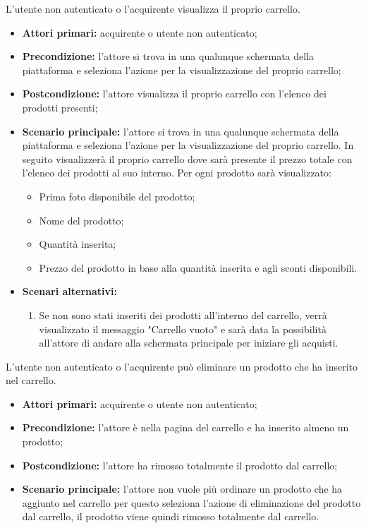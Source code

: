 L'utente non autenticato o l'acquirente visualizza il proprio carrello.
\begin{itemize}
    \item \textbf{Attori primari:} acquirente o utente non autenticato;
    \item \textbf{Precondizione:} l'attore si trova in una qualunque schermata della piattaforma e seleziona l'azione per la visualizzazione del proprio carrello;
    \item \textbf{Postcondizione:} l'attore visualizza il proprio carrello con l'elenco dei prodotti presenti;
    \item \textbf{Scenario principale:} l'attore si trova in una qualunque schermata della piattaforma e seleziona l'azione per la visualizzazione del proprio carrello. In seguito visualizzerà il proprio carrello dove sarà presente il prezzo totale con l'elenco dei prodotti al suo interno. Per ogni prodotto sarà visualizzato:
    \begin{itemize}
        \item Prima foto disponibile del prodotto;
        \item Nome del prodotto;
        \item Quantità inserita;
        \item Prezzo del prodotto in base alla quantità inserita e agli sconti disponibili.
    \end{itemize}
    \item \textbf{Scenari alternativi:} 
    \begin{enumerate}[label=\lett]
        \item Se non sono stati inseriti dei prodotti all'interno del carrello, verrà visualizzato il messaggio "Carrello vuoto" e sarà data la possibilità all'attore di andare alla schermata principale per iniziare gli acquisti.
    \end{enumerate}
\end{itemize}


L'utente non autenticato o l'acquirente può eliminare un prodotto che ha inserito nel carrello.
\begin{itemize}
    \item \textbf{Attori primari:} acquirente o utente non autenticato;
    \item \textbf{Precondizione:} l'attore è nella pagina del carrello e ha inserito almeno un prodotto;
    \item \textbf{Postcondizione:} l'attore ha rimosso totalmente il prodotto dal carrello;
    \item \textbf{Scenario principale:} l'attore non vuole più ordinare un prodotto che ha aggiunto nel carrello per questo seleziona l'azione di eliminazione del prodotto dal carrello, il prodotto viene quindi rimosso totalmente dal carrello.
\end{itemize}

